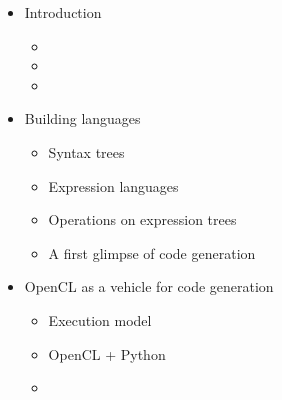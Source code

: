 \documentclass[english,compress]{beamer}
\begin{document}
\begin{frame}
  \begin{columns}
    \begin{itemize}
    \setlength{\itemsep}{0.0in}
    \item Introduction
      \begin{itemize}
        \item {}
        \item {}
        \item {}
      \end{itemize}
    \item Building languages
      \begin{itemize}
        \item Syntax trees
        \item Expression languages
        \item Operations on expression trees
        \item A first glimpse of code generation
      \end{itemize}
    \item OpenCL as a vehicle for code generation
      \begin{itemize}
        \item Execution model
        \item OpenCL + Python
        \item {}
      \end{itemize}
    \end{itemize}


\end{columns}
\end{frame}
\end{document}
